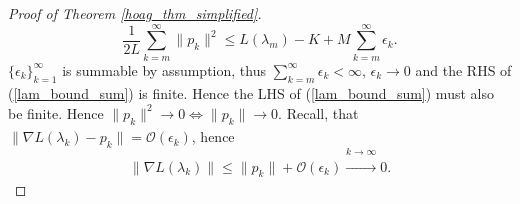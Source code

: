 \documentclass[11pt, twoside]{report}
\begin{document}
\begin{proof}[Proof of Theorem \ref{hoag_thm_simplified}]
\begin{equation} \label{lam_bound_sum}
   \frac{1}{2L}\sum_{k=m}^\infty \|p_k\|^2 \leq L(\lambda_m) - K + M\sum_{k=m}^\infty \epsilon_k.
\end{equation}
$\{\epsilon_k\}_{k=1}^\infty$ is summable by assumption, thus $\sum_{k=m}^\infty \epsilon_k < \infty$, $\epsilon_k \xrightarrow[]{} 0$ and the RHS of (\ref{lam_bound_sum}) is finite. Hence the LHS of (\ref{lam_bound_sum}) must also be finite. Hence $\|p_k\|^2 \xrightarrow[]{} 0 \iff \|p_k\| \xrightarrow[]{} 0.$ Recall, that $\|\nabla L(\lambda_k) - p_k\| = \mathcal{O}(\epsilon_k)$, hence 
\[\|\nabla L(\lambda_k)\| \leq \|p_k\| + \mathcal{O}(\epsilon_k) \xrightarrow[]{k \xrightarrow[]{} \infty} 0.\]

\end{proof}
\end{document}
